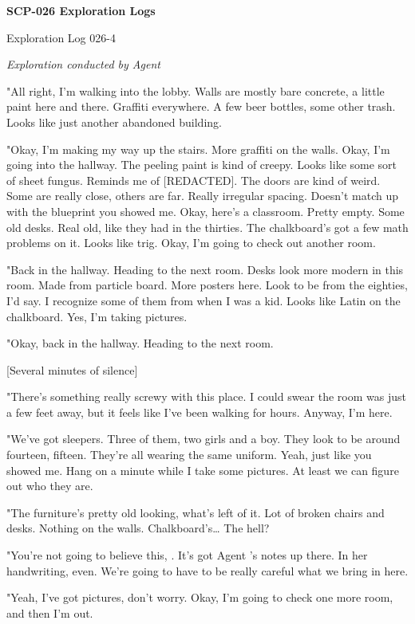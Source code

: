 \textbf{SCP-026 Exploration Logs}
\begin{flushleft}
Exploration Log 026-4
\end{flushleft}
\textsl{Exploration conducted by Agent }

"All right, I'm walking into the lobby. Walls are mostly bare concrete, a little paint here and there. Graffiti everywhere. A few beer bottles, some other trash. Looks like just another abandoned building.

"Okay, I'm making my way up the stairs. More graffiti on the walls. Okay, I'm going into the hallway. The peeling paint is kind of creepy. Looks like some sort of sheet fungus. Reminds me of [REDACTED]. The doors are kind of weird. Some are really close, others are far. Really irregular spacing. Doesn't match up with the blueprint you showed me. Okay, here's a classroom. Pretty empty. Some old desks. Real old, like they had in the thirties. The chalkboard's got a few math problems on it. Looks like trig. Okay, I'm going to check out another room.

"Back in the hallway. Heading to the next room. Desks look more modern in this room. Made from particle board. More posters here. Look to be from the eighties, I'd say. I recognize some of them from when I was a kid. Looks like Latin on the chalkboard. Yes, I'm taking pictures.

"Okay, back in the hallway. Heading to the next room.

[Several minutes of silence]

"There's something really screwy with this place. I could swear the room was just a few feet away, but it feels like I've been walking for hours. Anyway, I'm here.

"We've got sleepers. Three of them, two girls and a boy. They look to be around fourteen, fifteen. They're all wearing the same uniform. Yeah, just like you showed me. Hang on a minute while I take some pictures. At least we can figure out who they are.

"The furniture's pretty old looking, what's left of it. Lot of broken chairs and desks. Nothing on the walls. Chalkboard's… The hell?

"You're not going to believe this, . It's got Agent 's notes up there. In her handwriting, even. We're going to have to be really careful what we bring in here.

"Yeah, I've got pictures, don't worry. Okay, I'm going to check one more room, and then I'm out.

